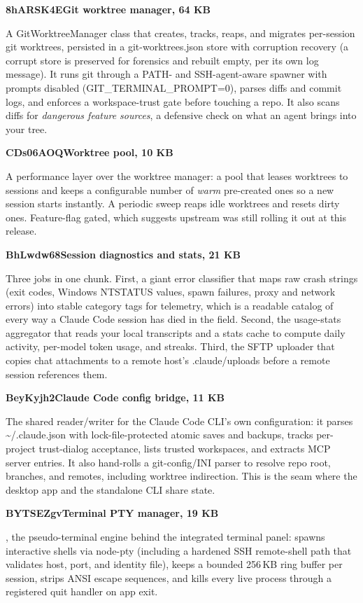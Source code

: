 \documentclass[11pt]{article}
\newcommand{\mono}{\ttfamily}
\newcommand{\reppar}[1]{{\fontsize{10.5}{15.2}\selectfont #1\par}\vspace{8pt}}
\newcommand{\code}[1]{{\mono\small #1}}
\newcommand{\chunkhead}[2]{%
  \vspace{4pt}%
  {\fontsize{10.5}{15.2}\selectfont
   {\mono\bfseries\color{accentink}#1}\;\textbullet\;\textbf{#2}\par}
  \vspace{2pt}}
\begin{document}
\chunkhead{8hARSK4E}{Git worktree manager, 64 KB}
\reppar{A \code{GitWorktreeManager} class that creates, tracks, reaps, and migrates per-session git worktrees, persisted in a \code{git-worktrees.json} store with corruption recovery (a corrupt store is preserved for forensics and rebuilt empty, per its own log message). It runs git through a PATH- and SSH-agent-aware spawner with prompts disabled (\code{GIT\_TERMINAL\_PROMPT=0}), parses diffs and commit logs, and enforces a workspace-trust gate before touching a repo. It also scans diffs for \textit{dangerous feature sources}, a defensive check on what an agent brings into your tree.}

\chunkhead{CDs06AOQ}{Worktree pool, 10 KB}
\reppar{A performance layer over the worktree manager: a pool that leases worktrees to sessions and keeps a configurable number of \textit{warm} pre-created ones so a new session starts instantly. A periodic sweep reaps idle worktrees and resets dirty ones. Feature-flag gated, which suggests upstream was still rolling it out at this release.}

\chunkhead{BhLwdw68}{Session diagnostics and stats, 21 KB}
\reppar{Three jobs in one chunk. First, a giant error classifier that maps raw crash strings (exit codes, Windows NTSTATUS values, spawn failures, proxy and network errors) into stable category tags for telemetry, which is a readable catalog of every way a Claude Code session has died in the field. Second, the usage-stats aggregator that reads your local transcripts and a stats cache to compute daily activity, per-model token usage, and streaks. Third, the SFTP uploader that copies chat attachments to a remote host's \code{.claude/uploads} before a remote session references them.}

\chunkhead{BeyKyjh2}{Claude Code config bridge, 11 KB}
\reppar{The shared reader/writer for the Claude Code CLI's own configuration: it parses \code{\textasciitilde/.claude.json} with lock-file-protected atomic saves and backups, tracks per-project trust-dialog acceptance, lists trusted workspaces, and extracts MCP server entries. It also hand-rolls a git-config/INI parser to resolve repo root, branches, and remotes, including worktree indirection. This is the seam where the desktop app and the standalone CLI share state.}

\chunkhead{BYTSEZgv}{Terminal PTY manager, 19 KB}
\reppar{\code{ShellPtyManager}, the pseudo-terminal engine behind the integrated terminal panel: spawns interactive shells via \code{node-pty} (including a hardened SSH remote-shell path that validates host, port, and identity file), keeps a bounded 256\,KB ring buffer per session, strips ANSI escape sequences, and kills every live process through a registered quit handler on app exit.}
\end{document}
